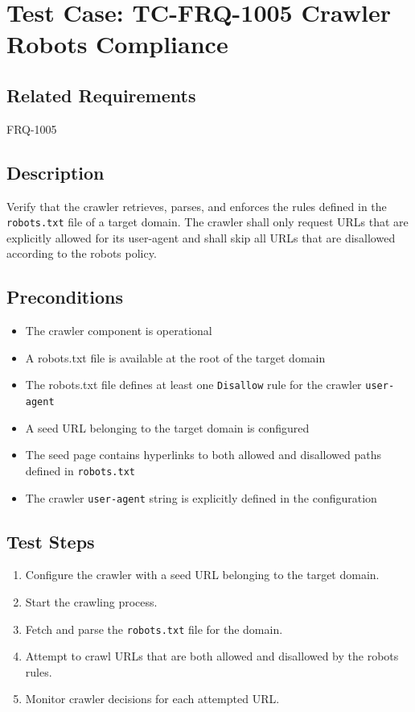 \documentclass{article}
\begin{document}


\section{Test Case: TC-FRQ-1005 \newline Crawler Robots Compliance}

\subsection*{Related Requirements}
FRQ-1005

\subsection*{Description}
Verify that the crawler retrieves, parses, and enforces the rules defined in the \texttt{robots.txt} file
of a target domain. The crawler shall only request URLs that are explicitly allowed for its user-agent
and shall skip all URLs that are disallowed according to the robots policy.

\subsection*{Preconditions}
\begin{itemize}
  \item The crawler component is operational
  \item A robots.txt file is available at the root of the target domain
  \item The robots.txt file defines at least one \texttt{Disallow} rule for the crawler \texttt{user-agent}
  \item A seed URL belonging to the target domain is configured
  \item The seed page contains hyperlinks to both allowed and disallowed paths defined in \texttt{robots.txt}
  \item The crawler \texttt{user-agent} string is explicitly defined in the configuration
\end{itemize}

\subsection*{Test Steps}
\begin{enumerate}
  \item Configure the crawler with a seed URL belonging to the target domain.
  \item Start the crawling process.
  \item Fetch and parse the \texttt{robots.txt} file for the domain.
  \item Attempt to crawl URLs that are both allowed and disallowed by the robots rules.
  \item Monitor crawler decisions for each attempted URL.
\end{enumerate}
\end{document}
